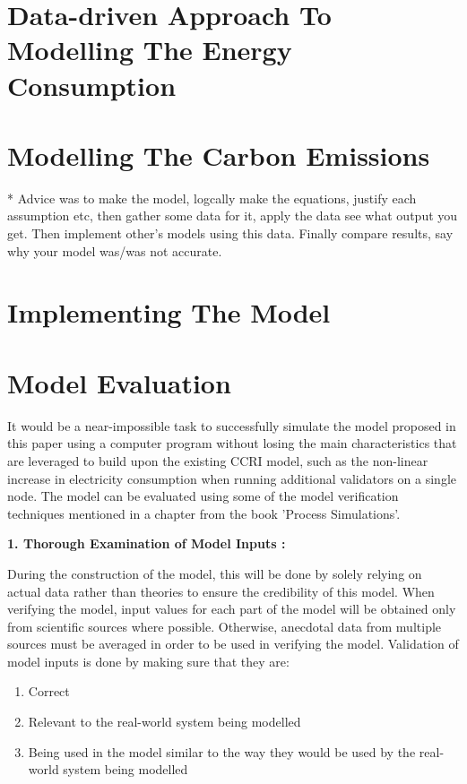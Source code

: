 \section {Data-driven Approach To Modelling The Energy Consumption}

\section {Modelling The Carbon Emissions }
* Advice was to make the model, logcally make the equations, justify each assumption etc, then gather some data for it, apply the data see what output you get. Then implement other's models using this data. Finally compare results, say why your model was/was not accurate.

\section {Implementing The Model}

\section {Model Evaluation}

 It would be a near-impossible task to successfully simulate the model proposed in this paper using a computer program without losing the main characteristics that are leveraged to build upon the existing CCRI model, such as the non-linear increase in electricity consumption when running additional validators on a single node. The model can be evaluated using some of the model verification techniques mentioned in a chapter \cite{Al-Aomar2015ModelTechniques} from the book 'Process Simulations'.

\textbf{1. Thorough Examination of Model Inputs :}

During the construction of the model, this will be done by solely relying on actual data rather than theories to ensure the credibility of this model. When verifying the model, input values for each part of the model will be obtained only from scientific sources where possible. Otherwise, anecdotal data from multiple sources must be averaged in order to be used in verifying the model. Validation of model inputs is done by making sure that they are:
\begin{enumerate}
    \item Correct
    \item Relevant to the real-world system being modelled
    \item Being used in the model similar to the way they would be used by the real-world system being modelled
\end{enumerate}  


